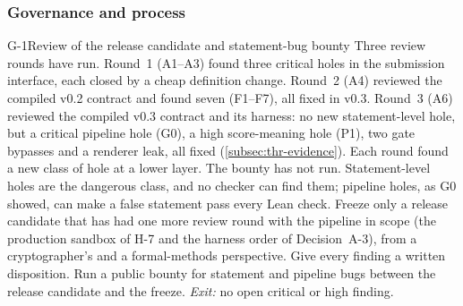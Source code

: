 \subsubsection{Governance and process}

\begin{issue}{G-1}{Review of the release candidate and statement-bug bounty}
\IRprob Three review rounds have run. Round~1 (A1--A3) found three critical holes in the submission
interface, each closed by a cheap definition change. Round~2 (A4) reviewed the compiled v0.2 contract
and found seven (F1--F7), all fixed in v0.3. Round~3 (A6) reviewed the compiled v0.3 contract and its
harness: no new statement-level hole, but a critical pipeline hole (G0), a high score-meaning hole
(P1), two gate bypasses and a renderer leak, all fixed (\cref{subsec:thr-evidence}). Each round found a new
class of hole at a lower layer. The bounty has not run.
\IRwhy Statement-level holes are the dangerous class, and no checker can find them; pipeline holes,
as G0 showed, can make a false statement pass every Lean check.
\IRres Freeze only a release candidate that has had one more review round with the pipeline in scope
(the production sandbox of H-7 and the harness order of Decision~A-3), from a cryptographer's and a
formal-methods perspective. Give every finding a written disposition. Run a public bounty for
statement and pipeline bugs between the release candidate and the freeze.
\emph{Exit:} no open critical or high finding.
\end{issue}

